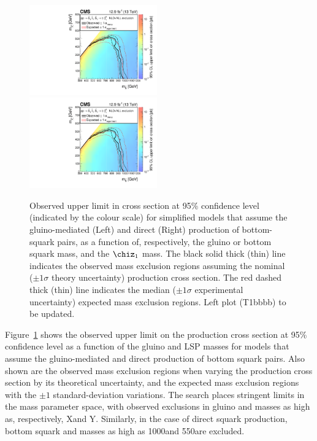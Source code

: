 \begin{figure}[thp!]
  \begin{center}
    \includegraphics[width=0.49\textwidth]{T2bb.pdf} ~
    \includegraphics[width=0.49\textwidth]{T2bb.pdf} \\
    \caption{Observed upper limit in cross section at 95\% confidence
      level (indicated by the colour scale) for simplified models that
      assume the gluino-mediated (Left) and direct (Right) production
      of bottom-squark pairs, as a function of, respectively, the
      gluino or bottom squark mass, and the $\chiz_{1}$ mass. The
      black solid thick (thin) line indicates the observed mass
      exclusion regions assuming the nominal (${\pm}1 \sigma$ theory
      uncertainty) production cross section. The red dashed thick
      (thin) line indicates the median (${\pm}1 \sigma$ experimental
      uncertainty) expected mass exclusion regions. {\color{red} Left
        plot (T1bbbb) to be updated. } }
      \label{fig:limits-sms} 
  \end{center}
\end{figure}

Figure~\ref{fig:limits-sms} shows the observed upper limit on the
production cross section at 95\% confidence level as a function of the
gluino and LSP masses for models that assume the gluino-mediated and
direct production of bottom squark pairs. Also shown are the observed
mass exclusion regions when varying the production cross section by
its theoretical uncertainty, and the expected mass exclusion regions
with the ${\pm}1$ standard-deviation variations. The search places
stringent limits in the mass parameter space, with observed exclusions
in gluino and \chiz masses as high as, respectively, X\gev and
Y\gev. Similarly, in the case of direct squark production, bottom
squark and \chiz masses as high as 1000\gev and 550\gev are excluded. 

